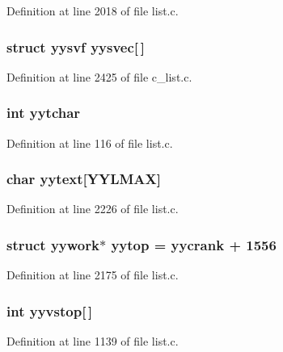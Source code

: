 Definition at line 2018 of file list.c.
\subsubsection{\setlength{\rightskip}{0pt plus 5cm}struct \bf{yysvf} \bf{yysvec}[$\,$]}\label{list_8c_2011359449066c5432dae89171db9d17}




Definition at line 2425 of file c\_\-list.c.
\subsubsection{\setlength{\rightskip}{0pt plus 5cm}int \bf{yytchar}}\label{list_8c_620e886e7e57cf0fcb0d54c2b9255521}




Definition at line 116 of file list.c.
\subsubsection{\setlength{\rightskip}{0pt plus 5cm}char \bf{yytext}[YYLMAX]}\label{list_8c_4ba51ee9c23e5cafe9859550167f6e2c}




Definition at line 2226 of file list.c.
\subsubsection{\setlength{\rightskip}{0pt plus 5cm}struct \bf{yywork}$\ast$ \bf{yytop} = \bf{yycrank} + 1556}\label{list_8c_a50ced6fc1dcd0ac66c184ddbc4ebca7}




Definition at line 2175 of file list.c.
\subsubsection{\setlength{\rightskip}{0pt plus 5cm}int \bf{yyvstop}[$\,$]}\label{list_8c_9cb00a23aa4d95b81cc33535ad4b1d49}




Definition at line 1139 of file list.c.
